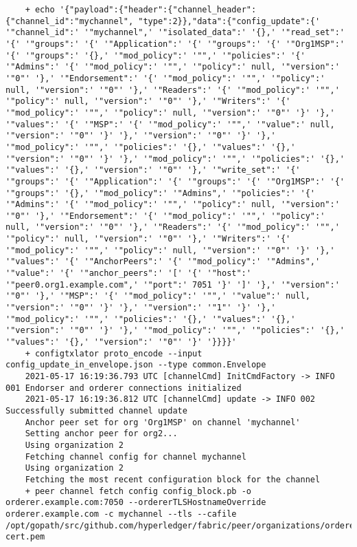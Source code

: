 \begin{lstlisting}
    + echo '{"payload":{"header":{"channel_header":{"channel_id":"mychannel", "type":2}},"data":{"config_update":{' '"channel_id":' '"mychannel",' '"isolated_data":' '{},' '"read_set":' '{' '"groups":' '{' '"Application":' '{' '"groups":' '{' '"Org1MSP":' '{' '"groups":' '{},' '"mod_policy":' '"",' '"policies":' '{' '"Admins":' '{' '"mod_policy":' '"",' '"policy":' null, '"version":' '"0"' '},' '"Endorsement":' '{' '"mod_policy":' '"",' '"policy":' null, '"version":' '"0"' '},' '"Readers":' '{' '"mod_policy":' '"",' '"policy":' null, '"version":' '"0"' '},' '"Writers":' '{' '"mod_policy":' '"",' '"policy":' null, '"version":' '"0"' '}' '},' '"values":' '{' '"MSP":' '{' '"mod_policy":' '"",' '"value":' null, '"version":' '"0"' '}' '},' '"version":' '"0"' '}' '},' '"mod_policy":' '"",' '"policies":' '{},' '"values":' '{},' '"version":' '"0"' '}' '},' '"mod_policy":' '"",' '"policies":' '{},' '"values":' '{},' '"version":' '"0"' '},' '"write_set":' '{' '"groups":' '{' '"Application":' '{' '"groups":' '{' '"Org1MSP":' '{' '"groups":' '{},' '"mod_policy":' '"Admins",' '"policies":' '{' '"Admins":' '{' '"mod_policy":' '"",' '"policy":' null, '"version":' '"0"' '},' '"Endorsement":' '{' '"mod_policy":' '"",' '"policy":' null, '"version":' '"0"' '},' '"Readers":' '{' '"mod_policy":' '"",' '"policy":' null, '"version":' '"0"' '},' '"Writers":' '{' '"mod_policy":' '"",' '"policy":' null, '"version":' '"0"' '}' '},' '"values":' '{' '"AnchorPeers":' '{' '"mod_policy":' '"Admins",' '"value":' '{' '"anchor_peers":' '[' '{' '"host":' '"peer0.org1.example.com",' '"port":' 7051 '}' ']' '},' '"version":' '"0"' '},' '"MSP":' '{' '"mod_policy":' '"",' '"value":' null, '"version":' '"0"' '}' '},' '"version":' '"1"' '}' '},' '"mod_policy":' '"",' '"policies":' '{},' '"values":' '{},' '"version":' '"0"' '}' '},' '"mod_policy":' '"",' '"policies":' '{},' '"values":' '{},' '"version":' '"0"' '}' '}}}}'
    + configtxlator proto_encode --input config_update_in_envelope.json --type common.Envelope
    2021-05-17 16:19:36.793 UTC [channelCmd] InitCmdFactory -> INFO 001 Endorser and orderer connections initialized
    2021-05-17 16:19:36.812 UTC [channelCmd] update -> INFO 002 Successfully submitted channel update
    Anchor peer set for org 'Org1MSP' on channel 'mychannel'
    Setting anchor peer for org2...
    Using organization 2
    Fetching channel config for channel mychannel
    Using organization 2
    Fetching the most recent configuration block for the channel
    + peer channel fetch config config_block.pb -o orderer.example.com:7050 --ordererTLSHostnameOverride orderer.example.com -c mychannel --tls --cafile /opt/gopath/src/github.com/hyperledger/fabric/peer/organizations/ordererOrganizations/example.com/orderers/orderer.example.com/msp/tlscacerts/tlsca.example.com-cert.pem

\end{lstlisting}
